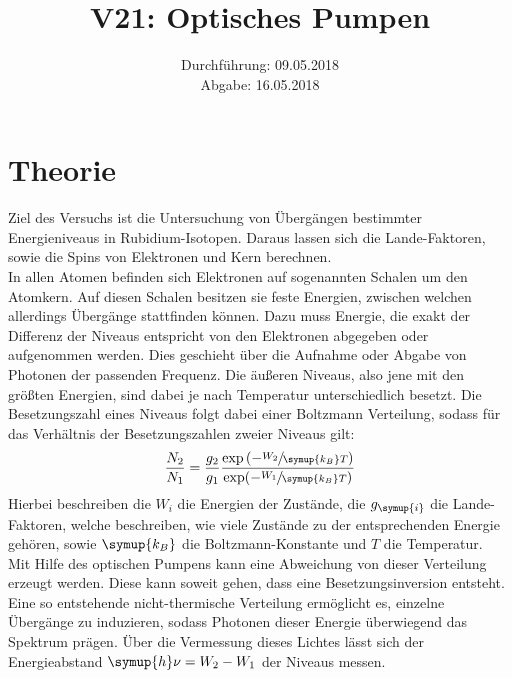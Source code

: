 \documentclass[
  bibliography=totoc,     %
  captions=tableheading,  %
  titlepage=firstiscover, %
]{scrartcl}
\title{V21: Optisches Pumpen}
\author{
  Simon Schulte
  \texorpdfstring{
    \\
    \href{mailto:simon.schulte@udo.edu}{simon.schulte@udo.edu}
  }{}
  \texorpdfstring{\and}{, }
  Tim Sedlaczek
  \texorpdfstring{
    \\
    \href{mailto:tim.sedlaczek@udo.edu}{tim.sedlaczek@udo.edu}
  }{}
}
\date{Durchführung: 09.05.2018\\
      Abgabe: 16.05.2018}
\begin{document}
\maketitle
\thispagestyle{empty}
\setcounter{page}{1}
\section{Theorie}
\label{sec:theorie}
Ziel des Versuchs ist die Untersuchung von Übergängen bestimmter
Energieniveaus in Rubidium-Isotopen. Daraus lassen sich die Lande-Faktoren,
sowie die Spins von Elektronen und Kern berechnen. \\
In allen Atomen befinden sich Elektronen auf sogenannten Schalen um den
Atomkern. Auf diesen Schalen besitzen sie feste Energien, zwischen welchen
allerdings Übergänge stattfinden können. Dazu muss Energie, die exakt der
Differenz der Niveaus entspricht von den Elektronen abgegeben oder aufgenommen
werden. Dies geschieht über die Aufnahme oder Abgabe von Photonen der
passenden Frequenz. Die äußeren Niveaus, also jene mit den größten Energien,
sind dabei je nach Temperatur unterschiedlich besetzt. Die Besetzungszahl eines
Niveaus folgt dabei einer Boltzmann Verteilung, sodass für das Verhältnis der
Besetzungszahlen zweier Niveaus gilt:
%
\begin{equation}
  \frac{N_2}{N_1}=\frac{g_2}{g_1}\frac{\exp\left(-\sfrac{W_2}{\symup{k_B}T}\right)}{\exp(-\sfrac{W_1}{\symup{k_B}T})}
\end{equation}
%
Hierbei beschreiben die $W_i$ die Energien der Zustände, die $g_{\symup{i}}$ die
Lande-Faktoren, welche beschreiben, wie viele Zustände zu der entsprechenden
Energie gehören, sowie $\symup{k_B}$ die Boltzmann-Konstante und $T$ die
Temperatur. \\
Mit Hilfe des optischen Pumpens kann eine Abweichung von dieser Verteilung
erzeugt werden. Diese kann soweit gehen, dass eine Besetzungsinversion
entsteht. Eine so entstehende nicht-thermische Verteilung ermöglicht es,
einzelne Übergänge zu induzieren, sodass Photonen dieser Energie überwiegend
das Spektrum prägen. Über die Vermessung dieses Lichtes lässt sich der
Energieabstand $\symup{h}\nu=W_2-W_1$ der Niveaus messen.
\end{document}
